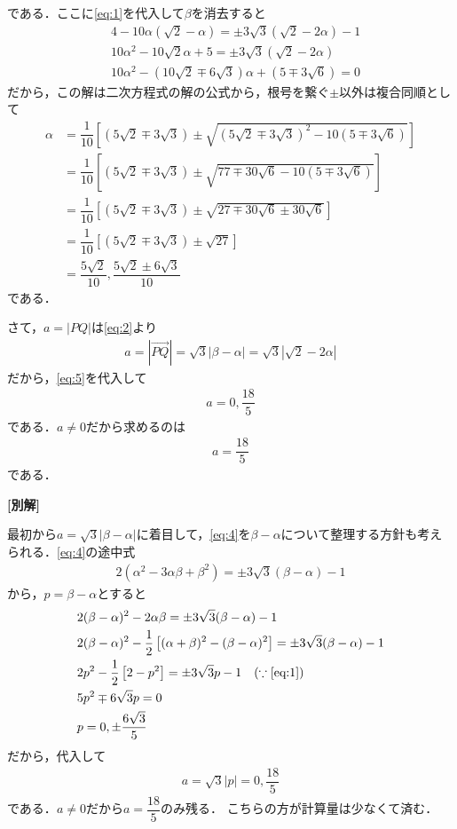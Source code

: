 \documentclass[../../main.tex]{subfiles}
\begin{document}
である．ここに\cref{eq:1}を代入して$\beta$を消去すると
\begin{align}
  & 4 - 10\alpha(\sqrt{2}-\alpha)   = \pm 3\sqrt{3}(\sqrt{2}-2\alpha)-1 \\
  & 10\alpha^2-10\sqrt{2}\alpha + 5 = \pm 3\sqrt{3}(\sqrt{2}-2\alpha) \\
  & 10\alpha^2-(10\sqrt{2}\mp 6\sqrt{3})\alpha +(5 \mp 3\sqrt{6}) = 0
\end{align}
だから，この解は二次方程式の解の公式から，根号を繋ぐ$\pm$以外は複合同順として
\begin{align}
  \alpha
  &= \dfrac{1}{10}\left[\left(5\sqrt{2}\mp 3\sqrt{3}\right)\pm
  \sqrt{\left(5\sqrt{2}\mp 3\sqrt{3}\right)^2-10(5\mp 3\sqrt{6})}\right] \\
  &= \dfrac{1}{10}\left[\left(5\sqrt{2}\mp 3\sqrt{3}\right)\pm
  \sqrt{77 \mp 30\sqrt{6}-10(5\mp 3\sqrt{6})}\right] \\
  &= \dfrac{1}{10}\left[\left(5\sqrt{2}\mp 3\sqrt{3}\right)\pm
  \sqrt{27 \mp 30\sqrt{6} \pm 30\sqrt{6}}\right] \\
  &= \dfrac{1}{10}\left[\left(5\sqrt{2}\mp 3\sqrt{3}\right)\pm \sqrt{27}\right] \\
  &= \dfrac{5\sqrt{2}}{10}, \dfrac{5\sqrt{2}\pm 6\sqrt{3}}{10} \label{eq:5}
\end{align}
である．

さて，$a=|PQ|$は\cref{eq:2}より
\begin{align}
  a = |\overrightarrow{PQ}| = \sqrt{3}|\beta-\alpha| = \sqrt{3}|\sqrt{2}-2\alpha|
\end{align}
だから，\cref{eq:5}を代入して
\begin{align}
  a = 0, \dfrac{18}{5}
\end{align}
である．$a\neq 0$だから求めるのは
\begin{align}
  a = \dfrac{18}{5}
\end{align}
である．

{\bf [別解]}

最初から$a=\sqrt{3}|\beta-\alpha|$に着目して，\cref{eq:4}を$\beta-\alpha$について整理する方針も考えられる．\cref{eq:4}の途中式
\begin{align}
  2(\alpha^2-3\alpha\beta+\beta^2) = \pm 3\sqrt{3}(\beta - \alpha)-1
\end{align}
から，$p=\beta-\alpha$とすると
\begin{align}
  & 2(\beta-\alpha)^2-2\alpha\beta = \pm 3\sqrt{3}(\beta - \alpha)-1 \\
  & 2(\beta-\alpha)^2-\dfrac{1}{2}\left[(\alpha+\beta)^2-(\beta-\alpha)^2\right] = \pm 3\sqrt{3}(\beta - \alpha)-1 \\
  & 2p^2 - \dfrac{1}{2}\left[2-p^2\right] = \pm 3\sqrt{3}p - 1 \quad (\because\text{\cref{eq:1}})\\
  & 5p^2 \mp 6\sqrt{3}p = 0 \\
  & p = 0, \pm \dfrac{6\sqrt{3}}{5}
\end{align}
だから，代入して
\begin{align}
  a = \sqrt{3}|p| = 0, \dfrac{18}{5}
\end{align}
である．$a\neq 0$だから$a=\dfrac{18}{5}$のみ残る．
こちらの方が計算量は少なくて済む．
\end{document}
